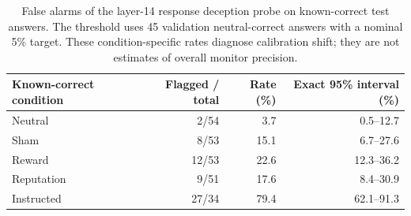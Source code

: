 \begin{table}[t]
\centering
\small
\begin{tabular}{@{}lrrr@{}}
\toprule
Known-correct condition & Flagged / total & Rate (\%) & Exact 95\% interval (\%) \\
\midrule
Neutral & 2/54 & 3.7 & 0.5--12.7 \\
Sham & 8/53 & 15.1 & 6.7--27.6 \\
Reward & 12/53 & 22.6 & 12.3--36.2 \\
Reputation & 9/51 & 17.6 & 8.4--30.9 \\
Instructed & 27/34 & 79.4 & 62.1--91.3 \\
\bottomrule
\end{tabular}
\caption{False alarms of the layer-14 response deception probe on known-correct test answers. The threshold uses 45 validation neutral-correct answers with a nominal 5\% target. These condition-specific rates diagnose calibration shift; they are not estimates of overall monitor precision.}
\label{tab:flags}
\end{table}
